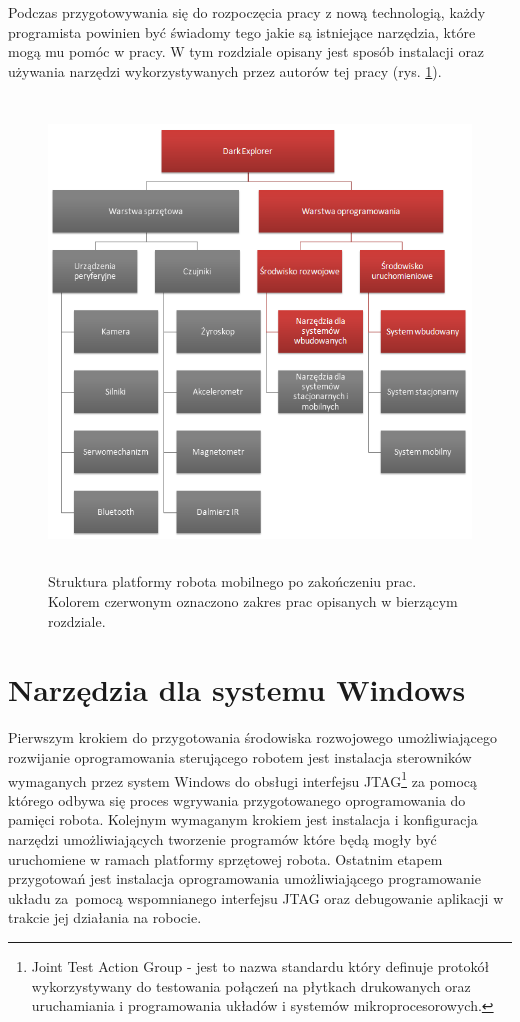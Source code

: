 Podczas przygotowywania się do rozpoczęcia pracy z nową technologią, każdy
programista powinien być świadomy tego jakie są istniejące narzędzia, które mogą
mu pomóc w pracy. W tym rozdziale opisany jest sposób instalacji oraz używania
narzędzi wykorzystywanych przez autorów tej pracy (rys.
\ref{fig:DarkExplorerPlatformIDE}).

\begin{figure}[!ht]
 \centering
 \includegraphics[height=125mm]{../images/ch03/dark_explorer_platform_ide_embeded.png}
 \caption{Struktura platformy robota mobilnego po zakończeniu prac. Kolorem
 czerwonym oznaczono zakres prac opisanych w bierzącym rozdziale.}
 \label{fig:DarkExplorerPlatformIDE}
\end{figure}

\section{Narzędzia dla systemu Windows}
\label{sec:embeded-win-tools}
Pierwszym krokiem do przygotowania środowiska rozwojowego umożliwiającego
rozwijanie oprogramowania sterującego robotem jest instalacja sterowników
wymaganych przez system Windows do obsługi interfejsu JTAG\footnote{Joint Test
Action Group - jest to nazwa standardu który definuje protokół wykorzystywany do
testowania połączeń na płytkach drukowanych oraz uruchamiania i programowania
układów i systemów mikroprocesorowych. } za pomocą którego odbywa się proces
wgrywania przygotowanego oprogramowania do pamięci robota. Kolejnym wymaganym
krokiem jest instalacja i konfiguracja narzędzi umożliwiających tworzenie
programów które będą mogły być uruchomiene w ramach platformy sprzętowej
robota. Ostatnim etapem przygotowań jest instalacja oprogramowania umożliwiającego programowanie układu za~pomocą wspomnianego interfejsu JTAG oraz
debugowanie aplikacji w trakcie jej działania na robocie.

